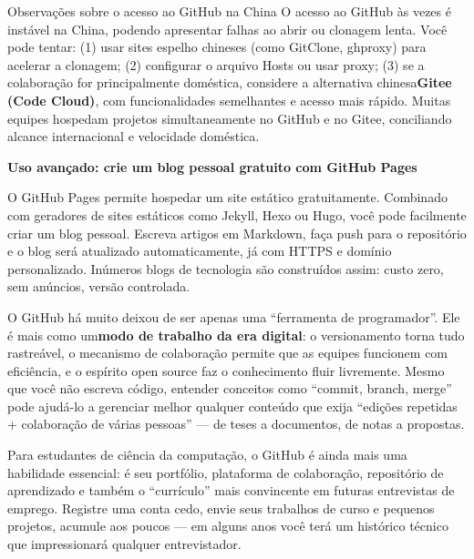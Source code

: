 \begin{tcbinfo}{Observações sobre o acesso ao GitHub na China}
O acesso ao GitHub às vezes é instável na China, podendo apresentar falhas ao abrir ou clonagem lenta. Você pode tentar: (1) usar sites espelho chineses (como GitClone, ghproxy) para acelerar a clonagem; (2) configurar o arquivo Hosts ou usar proxy; (3) se a colaboração for principalmente doméstica, considere a alternativa chinesa\textbf{Gitee (Code Cloud)}, com funcionalidades semelhantes e acesso mais rápido. Muitas equipes hospedam projetos simultaneamente no GitHub e no Gitee, conciliando alcance internacional e velocidade doméstica.

\end{tcbinfo}

\textbf{Uso avançado: crie um blog pessoal gratuito com GitHub Pages}\par

O GitHub Pages permite hospedar um site estático gratuitamente. Combinado com geradores de sites estáticos como Jekyll, Hexo ou Hugo, você pode facilmente criar um blog pessoal. Escreva artigos em Markdown, faça push para o repositório e o blog será atualizado automaticamente, já com HTTPS e domínio personalizado. Inúmeros blogs de tecnologia são construídos assim: custo zero, sem anúncios, versão controlada.


O GitHub há muito deixou de ser apenas uma “ferramenta de programador”. Ele é mais como um\textbf{modo de trabalho da era digital}: o versionamento torna tudo rastreável, o mecanismo de colaboração permite que as equipes funcionem com eficiência, e o espírito open source faz o conhecimento fluir livremente. Mesmo que você não escreva código, entender conceitos como “commit, branch, merge” pode ajudá-lo a gerenciar melhor qualquer conteúdo que exija “edições repetidas + colaboração de várias pessoas” — de teses a documentos, de notas a propostas.

Para estudantes de ciência da computação, o GitHub é ainda mais uma habilidade essencial: é seu portfólio, plataforma de colaboração, repositório de aprendizado e também o “currículo” mais convincente em futuras entrevistas de emprego. Registre uma conta cedo, envie seus trabalhos de curso e pequenos projetos, acumule aos poucos — em alguns anos você terá um histórico técnico que impressionará qualquer entrevistador.


